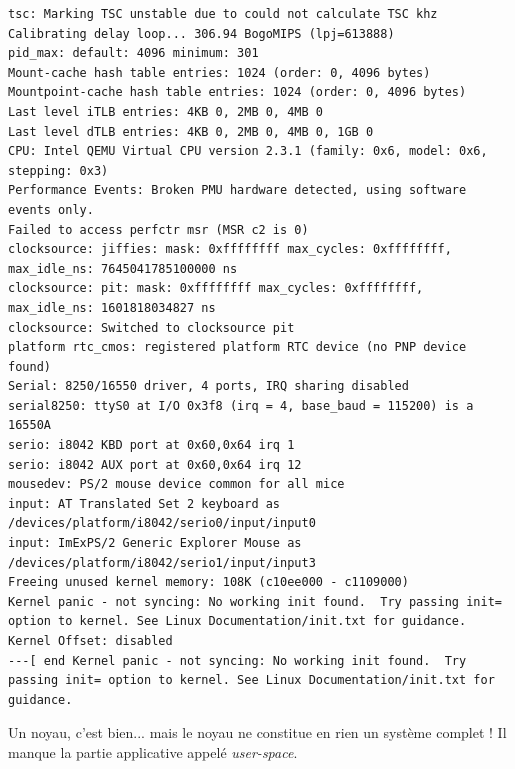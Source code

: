 \documentclass[a4paper]{article}
\begin{document}
\begin{verbatim}
tsc: Marking TSC unstable due to could not calculate TSC khz
Calibrating delay loop... 306.94 BogoMIPS (lpj=613888)
pid_max: default: 4096 minimum: 301
Mount-cache hash table entries: 1024 (order: 0, 4096 bytes)
Mountpoint-cache hash table entries: 1024 (order: 0, 4096 bytes)
Last level iTLB entries: 4KB 0, 2MB 0, 4MB 0
Last level dTLB entries: 4KB 0, 2MB 0, 4MB 0, 1GB 0
CPU: Intel QEMU Virtual CPU version 2.3.1 (family: 0x6, model: 0x6, stepping: 0x3)
Performance Events: Broken PMU hardware detected, using software events only.
Failed to access perfctr msr (MSR c2 is 0)
clocksource: jiffies: mask: 0xffffffff max_cycles: 0xffffffff, max_idle_ns: 7645041785100000 ns
clocksource: pit: mask: 0xffffffff max_cycles: 0xffffffff, max_idle_ns: 1601818034827 ns
clocksource: Switched to clocksource pit
platform rtc_cmos: registered platform RTC device (no PNP device found)
Serial: 8250/16550 driver, 4 ports, IRQ sharing disabled
serial8250: ttyS0 at I/O 0x3f8 (irq = 4, base_baud = 115200) is a 16550A
serio: i8042 KBD port at 0x60,0x64 irq 1
serio: i8042 AUX port at 0x60,0x64 irq 12
mousedev: PS/2 mouse device common for all mice
input: AT Translated Set 2 keyboard as /devices/platform/i8042/serio0/input/input0
input: ImExPS/2 Generic Explorer Mouse as /devices/platform/i8042/serio1/input/input3
Freeing unused kernel memory: 108K (c10ee000 - c1109000)
Kernel panic - not syncing: No working init found.  Try passing init= option to kernel. See Linux Documentation/init.txt for guidance.
Kernel Offset: disabled
---[ end Kernel panic - not syncing: No working init found.  Try passing init= option to kernel. See Linux Documentation/init.txt for guidance.
\end{verbatim}

Un noyau, c'est bien... mais le noyau ne constitue en rien un système complet ! Il manque la partie applicative appelé \textit{user-space}.

\clearpage
\listoffigures
\end{document}
